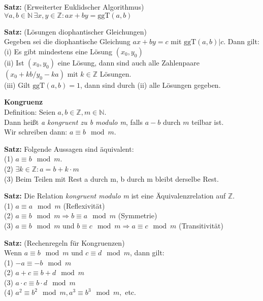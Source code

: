 \documentclass[a4paper]{article}
\newcommand{\Mod}[3]{#1\equiv#2\mod#3}
\begin{document}
\textbf{Satz:} (Erweiterter Euklidscher Algorithmus) \\
$\forall a, b \in \mathbb{N} \, \exists x, y \in \mathbb{Z}: ax + by = \text{ggT}(a,b)$
\bigskip

\textbf{Satz:} (Lösungen diophantischer Gleichungen) \\
Gegeben sei die diophantische Gleichung $ax+by=c$ mit $\text{ggT}(a,b)|c$. Dann gilt: \\
 (i)  Es gibt mindestens eine Lösung $(x_0,y_0)$ \\
(ii) Ist $(x_0,y_0)$ eine Lösung, dann sind auch alle
Zahlenpaare $(x_0+k b/y_0-k a)$ mit $k \in \mathbb{Z}$ Lösungen. \\
(iii) Gilt $\text{ggT}(a,b) = 1$, dann sind durch (ii) alle Lösungen gegeben. 
\bigskip

\textbf{Kongruenz} \\
Definition: Seien $a, b \in \mathbb{Z} ,m \in \mathbb{N}$. \\
Dann heißt \textit{a kongruent zu b modulo m}, falls $a-b$ durch $m$ teilbar ist. \\ Wir schreiben dann: $\Mod{a}{b}{m}$.
\bigskip

\textbf{Satz:} Folgende Aussagen sind äquivalent: \\
(1) $\Mod{a}{b}{m}$. \\
(2) $\exists k \in \mathbb{Z}: a = b + k \cdot m$ \\
(3) Beim Teilen mit Rest a durch m, b durch m bleibt derselbe Rest. 
\bigskip

\textbf{Satz:} Die Relation \textit{kongruent modulo m} ist eine Äquivalenzrelation auf $\mathbb{Z}$. \\
(1) $\Mod{a}{a}{m}$ \quad (Reflexivität) \\
(2) $\Mod{a}{b}{m} \Rightarrow \Mod{b}{a}{m}$ \quad (Symmetrie) \\
(3) $\Mod{a}{b}{m}$ und $\Mod{b}{c}{m} \Rightarrow \Mod{a}{c}{m}$ \quad (Transitivität) 
\bigskip

\textbf{Satz:} (Rechenregeln für Kongruenzen) \\
Wenn  $\Mod{a}{b}{m}$ und  $\Mod{c}{d}{m}$, dann gilt: \\
(1)  $\Mod{-a}{-b}{m}$  \\
(2)  $\Mod{a+c}{b+d}{m}$ \\
(3)  $\Mod{a\cdot c}{b \cdot d}{m}$ \\
(4)  $\Mod{a^2}{b^2}{m},  \Mod{a^3}{b^3}{m},$ etc. \\

\newpage
\end{document}
